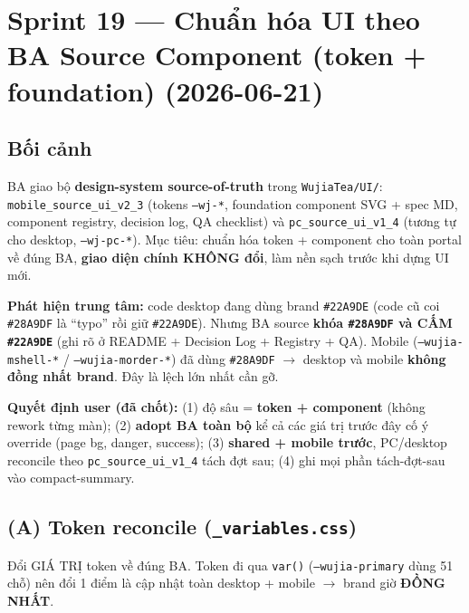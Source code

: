 \chapter{Sprint 19 --- Chuẩn hóa UI theo BA Source Component (token + foundation) (2026-06-21)}

\section{Bối cảnh}

BA giao bộ \textbf{design-system source-of-truth} trong \texttt{WujiaTea/UI/}:
\texttt{mobile\_source\_ui\_v2\_3} (tokens \texttt{--wj-*}, foundation component SVG + spec MD,
component registry, decision log, QA checklist) và \texttt{pc\_source\_ui\_v1\_4} (tương tự
cho desktop, \texttt{--wj-pc-*}). Mục tiêu: chuẩn hóa token + component cho toàn portal về
đúng BA, \textbf{giao diện chính KHÔNG đổi}, làm nền sạch trước khi dựng UI mới.

\textbf{Phát hiện trung tâm:} code desktop đang dùng brand \texttt{\#22A9DE} (code cũ coi
\texttt{\#28A9DF} là ``typo'' rồi giữ \texttt{\#22A9DE}). Nhưng BA source \textbf{khóa
\texttt{\#28A9DF} và CẤM \texttt{\#22A9DE}} (ghi rõ ở README + Decision Log + Registry + QA).
Mobile (\texttt{--wujia-mshell-*} / \texttt{--wujia-morder-*}) đã dùng \texttt{\#28A9DF} \(\rightarrow\)
desktop và mobile \textbf{không đồng nhất brand}. Đây là lệch lớn nhất cần gỡ.

\textbf{Quyết định user (đã chốt):} (1) độ sâu = \textbf{token + component} (không rework
từng màn); (2) \textbf{adopt BA toàn bộ} kể cả các giá trị trước đây cố ý override (page bg,
danger, success); (3) \textbf{shared + mobile trước}, PC/desktop reconcile theo
\texttt{pc\_source\_ui\_v1\_4} tách đợt sau; (4) ghi mọi phần tách-đợt-sau vào compact-summary.

\section{(A) Token reconcile (\texttt{\_variables.css})}

Đổi GIÁ TRỊ token về đúng BA. Token đi qua \texttt{var()} (\texttt{--wujia-primary} dùng 51
chỗ) nên đổi 1 điểm là cập nhật toàn desktop + mobile \(\rightarrow\) brand giờ \textbf{ĐỒNG NHẤT}.

